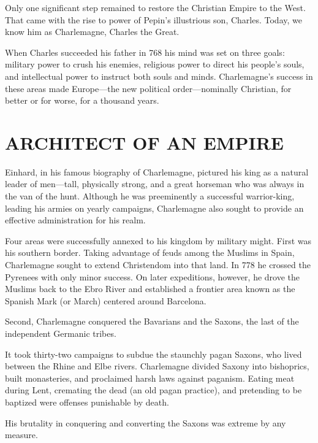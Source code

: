 Only one significant step remained to restore the Christian Empire to the West. That came with the
rise to power of Pepin’s illustrious son, Charles. Today, we know him as Charlemagne, Charles the
Great.

When Charles succeeded his father in 768 his mind was set on three goals: military power to crush
his enemies, religious power to direct his people’s souls, and intellectual power to instruct both
souls and minds. Charlemagne’s success in these areas made Europe—the new political order—nominally
Christian, for better or for worse, for a thousand years.

\section{ARCHITECT OF AN EMPIRE}

\begin{blockquote}
Einhard, in his famous biography of Charlemagne, pictured his king as a natural leader of men—tall,
physically strong, and a great horseman who was always in the van of the hunt. Although he was
preeminently a successful warrior-king, leading his armies on yearly campaigns, Charlemagne also
sought to provide an effective administration for his realm.
\end{blockquote}

Four areas were successfully annexed to his kingdom by military might. First was his southern
border. Taking advantage of feuds among the Muslims in Spain, Charlemagne sought to extend
Christendom into that land. In 778 he crossed the Pyrenees with only minor success. On later
expeditions, however, he drove the Muslims back to the Ebro River and established a frontier area
known as the Spanish Mark (or March) centered around Barcelona.

Second, Charlemagne conquered the Bavarians and the Saxons, the last of the independent Germanic
tribes.

\begin{blockquote}
It took thirty-two campaigns to subdue the staunchly pagan Saxons, who lived between the Rhine and
Elbe rivers. Charlemagne divided Saxony into bishoprics, built monasteries, and proclaimed harsh
laws against paganism. Eating meat during Lent, cremating the dead (an old pagan practice), and
pretending to be baptized were offenses punishable by death.
\end{blockquote}

His brutality in conquering and converting the Saxons was extreme by any measure.

